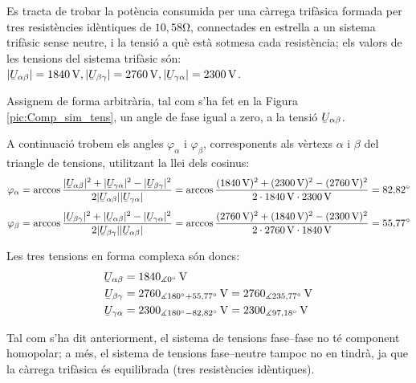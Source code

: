 \begin{exemple}
Es tracta de trobar la pot\`{e}ncia consumida per una c\`{a}rrega trif\`{a}sica
formada per tres resist\`{e}ncies id\`{e}ntiques de $10{,}58\unit{\ohm}$,
connectades en estrella a un sistema trif\`{a}sic sense neutre, i la
tensi\'{o} a qu\`{e} est\`{a} sotmesa cada resist\`{e}ncia; els valors de les
tensions del sistema trif\`{a}sic s\'{o}n: $|\cmplx{U}_{\alpha\beta}| =
1840\unit{V}, |\cmplx{U}_{\beta\gamma}| = 2760\unit{V},
|\cmplx{U}_{\gamma\alpha}| = 2300\unit{V}$.

Assignem de forma arbitr\`{a}ria, tal com s'ha fet en la Figura
\vref{pic:Comp_sim_tens}, un angle de fase igual a zero, a la tensi\'{o}
$\cmplx{U}_{\alpha\beta}$.

A continuaci\'{o} trobem els angles $\varphi_\alpha$ i $\varphi_\beta$,
corresponents als v\`{e}rtexs  $\alpha$ i $\beta$ del triangle de
tensions, utilitzant la llei dels cosinus: 
\begin{align*}
    \varphi_\alpha &= \arccos \frac{|\cmplx{U}_{\alpha\beta}|^2 + |\cmplx{U}_{\gamma\alpha}|^2 -
    |\cmplx{U}_{\beta\gamma}|^2}{2 |\cmplx{U}_{\alpha\beta}| |\cmplx{U}_{\gamma\alpha}|} =
    \arccos \frac{(1840\unit{V})^2 + (2300\unit{V})^2 - (2760\unit{V})^2}{2 \cdot 1840\unit{V}
    \cdot 2300\unit{V}} = 82{,}82\degree \\[1ex]
    \varphi_\beta &= \arccos \frac{|\cmplx{U}_{\beta\gamma}|^2 + |\cmplx{U}_{\alpha\beta}|^2 -
    |\cmplx{U}_{\gamma\alpha}|^2}{2 |\cmplx{U}_{\beta\gamma}| |\cmplx{U}_{\alpha\beta}|} =
    \arccos \frac{(2760\unit{V})^2 + (1840\unit{V})^2 - (2300\unit{V})^2}{2 \cdot 2760\unit{V}
    \cdot 1840\unit{V}} = 55{,}77\degree
\end{align*}

Les tres tensions en forma complexa s\'{o}n doncs:
\begin{align*}
\cmplx{U}_{\alpha\beta} &= 1840_{\measuredangle 0\degree}\unit{V} \\
\cmplx{U}_{\beta\gamma} &= 2760_{\measuredangle 180\degree +
55{,}77\degree}\unit{V} =
2760_{\measuredangle 235{,}77\degree}\unit{V} \\
\cmplx{U}_{\gamma\alpha} &= 2300_{\measuredangle 180\degree -
82{,}82\degree}\unit{V} = 2300_{\measuredangle 97{,}18\degree}
\unit{V}
\end{align*}

Tal com s'ha dit anteriorment, el sistema de tensions fase--fase no
t\'{e} component homopolar; a m\'{e}s, el sistema de tensions fase--neutre
tampoc no en tindr\`{a}, ja que la c\`{a}rrega trif\`{a}sica \'{e}s equilibrada
(tres resist\`{e}ncies id\`{e}ntiques).


\end{exemple}
